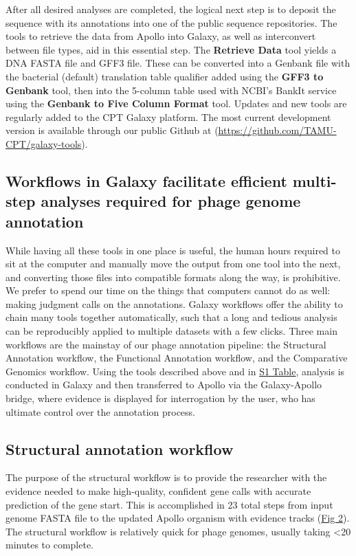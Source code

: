 After all desired analyses are completed, the logical next step is to
deposit the sequence with its annotations into one of the public
sequence repositories. The tools to retrieve the data from Apollo into
Galaxy, as well as interconvert between file types, aid in this
essential step. The \textbf{Retrieve Data} tool yields a DNA FASTA file
and GFF3 file. These can be converted into a Genbank file with the
bacterial (default) translation table qualifier added using the
\textbf{GFF3 to Genbank} tool, then into the 5-column table used with
NCBI's BankIt service using the \textbf{Genbank to Five Column Format}
tool. Updates and new tools are regularly added to the CPT Galaxy
platform. The most current development version is available through our
public Github at (\url{https://github.com/TAMU-CPT/galaxy-tools}).

\subsection*{Workflows in Galaxy facilitate efficient multi-step analyses required for phage genome annotation}

While having all these tools in one place is useful, the human hours
required to sit at the computer and manually move the output from one
tool into the next, and converting those files into compatible formats
along the way, is prohibitive. We prefer to spend our time on the things
that computers cannot do as well: making judgment calls on the
annotations. Galaxy workflows offer the ability to chain many tools
together automatically, such that a long and tedious analysis can be
reproducibly applied to multiple datasets with a few clicks. Three main
workflows are the mainstay of our phage annotation pipeline: the
Structural Annotation workflow, the Functional Annotation workflow, and
the Comparative Genomics workflow. Using the tools described above and
in \protect\hyperlink{pcbi.1008214.s001}{S1 Table}, analysis is
conducted in Galaxy and then transferred to Apollo via the Galaxy-Apollo
bridge, where evidence is displayed for interrogation by the user, who
has ultimate control over the annotation process.

\subsection*{Structural annotation workflow}

The purpose of the structural workflow is to provide the researcher with
the evidence needed to make high-quality, confident gene calls with
accurate prediction of the gene start. This is accomplished in 23 total
steps from input genome FASTA file to the updated Apollo organism with
evidence tracks (\protect\hyperlink{pcbi.1008214.g002}{Fig 2}). The
structural workflow is relatively quick for phage genomes, usually
taking \textless20 minutes to complete.

